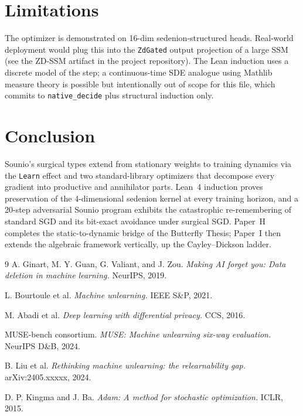 \documentclass{article}
\begin{document}
\section{Limitations}

The optimizer is demonstrated on 16-dim sedenion-structured heads.
Real-world deployment would plug this into the \texttt{ZdGated}
output projection of a large SSM (see the ZD-SSM artifact in the
project repository).  The Lean induction uses a discrete model of
the step; a continuous-time SDE analogue using Mathlib measure
theory is possible but intentionally out of scope for this file,
which commits to \texttt{native\_decide} plus structural induction
only.

\section{Conclusion}

Sounio's surgical types extend from stationary weights to training
dynamics via the \texttt{Learn} effect and two standard-library
optimizers that decompose every gradient into productive and
annihilator parts.  Lean~4 induction proves preservation of the
4-dimensional sedenion kernel at every training horizon, and a
20-step adversarial Sounio program exhibits the catastrophic
re-remembering of standard SGD and its bit-exact avoidance under
surgical SGD.  Paper~H completes the static-to-dynamic bridge of
the Butterfly Thesis; Paper~I then extends the algebraic framework
vertically, up the Cayley--Dickson ladder.


\begin{thebibliography}{9}
A. Ginart, M. Y. Guan, G. Valiant, and J. Zou.
\emph{Making AI forget you: Data deletion in machine learning.}
NeurIPS, 2019.

L. Bourtoule et al.
\emph{Machine unlearning.}
IEEE S\&P, 2021.

M. Abadi et al.
\emph{Deep learning with differential privacy.}
CCS, 2016.

MUSE-bench consortium.
\emph{MUSE: Machine unlearning six-way evaluation.}
NeurIPS D\&B, 2024.

B. Liu et al.
\emph{Rethinking machine unlearning: the relearnability gap.}
arXiv:2405.xxxxx, 2024.

D. P. Kingma and J. Ba.
\emph{Adam: A method for stochastic optimization.}
ICLR, 2015.
\end{thebibliography}
\end{document}

